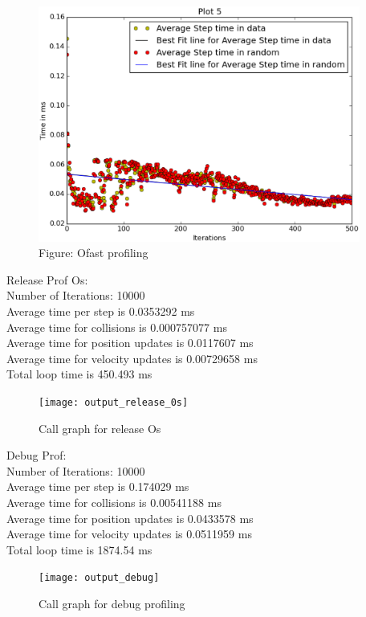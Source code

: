\documentclass[english, 11pt]{article}
\begin{document}
\begin{figure}
	\begin{center}
		\includegraphics[width=400px]{ofast5}
	\end{center}
	\caption{Figure: Ofast profiling}
\end{figure}

Release Prof Os:\\
Number of Iterations: 10000\\
Average time per step is 0.0353292 ms\\
Average time for collisions is 0.000757077 ms\\
Average time for position updates is 0.0117607 ms\\
Average time for velocity updates is 0.00729658 ms\\
Total loop time is 450.493 ms\\

\begin{figure}
	\begin{center}
		\texttt{[image: output\_release\_0s]}
	\end{center}
	\caption{Call graph for release Os}
\end{figure}


Debug Prof:\\
Number of Iterations: 10000\\
Average time per step is 0.174029 ms\\
Average time for collisions is 0.00541188 ms\\
Average time for position updates is 0.0433578 ms\\
Average time for velocity updates is 0.0511959 ms\\
Total loop time is 1874.54 ms\\

\begin{figure}
	\begin{center}
		\texttt{[image: output\_debug]}
	\end{center}
	\caption{Call graph for debug profiling}
\end{figure}
\end{document}
